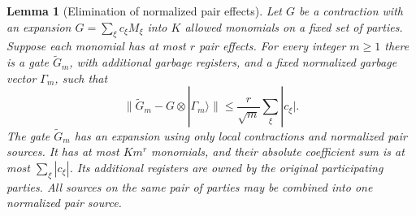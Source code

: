 \documentclass[11pt]{article}
\numberwithin{equation}{section}
\newtheorem{lemma}[theorem]{Lemma}
\theoremstyle{definition}
\theoremstyle{remark}
\begin{document}
\begin{lemma}[Elimination of normalized pair effects]
\label{lem:effects}
Let $G$ be a contraction with an expansion
$G=\sum_{\xi}c_{\xi}M_{\xi}$ into $K$ allowed monomials on a fixed set of
parties.  Suppose each monomial has at most $r$ pair effects.  For every
integer $m\ge1$ there is a gate $\widetilde G_m$, with additional garbage
registers, and a fixed normalized garbage vector $\Gamma_m$, such that
\begin{equation}
 \lVert \widetilde G_m-G\otimes|\Gamma_m\rangle\rVert
 \le \frac{r}{\sqrt m}\sum_{\xi}|c_{\xi}|.
 \label{eq:compression-effect-error}
\end{equation}
The gate $\widetilde G_m$ has an expansion using only local contractions
and normalized pair sources.  It has at most $K m^r$ monomials, and their
absolute coefficient sum is at most $\sum_{\xi}|c_{\xi}|$.  Its additional
registers are owned by the original participating parties.  All sources
on the same pair of parties may be combined into one normalized pair
source.
\end{lemma}
\end{document}
